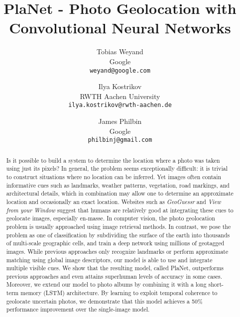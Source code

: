 \documentclass[10pt,twocolumn,letterpaper]{article}
\begin{document}
\title{PlaNet - Photo Geolocation with Convolutional Neural Networks}

\author{Tobias Weyand\\
Google\\
{\tt\small weyand@google.com}
\and
Ilya Kostrikov\\
RWTH Aachen University\\
{\tt\small ilya.kostrikov@rwth-aachen.de}
\and
James Philbin\\
Google\\
{\tt\small philbinj@gmail.com}
}

\maketitle

\graphicspath{{images/}}

\newcommand{\PAR}[1]{\vskip4pt \noindent {\bf #1}}

\makeatletter
\DeclareRobustCommand\onedot{\futurelet\@let@token\@onedot}
\def\@onedot{\ifx\@let@token.\else.\null\fi\xspace}
\def\eg{\emph{e.g}\onedot} \def\Eg{\emph{E.g}\onedot}
\def\ie{\emph{i.e}\onedot} \def\Ie{\emph{I.e}\onedot}
\def\cf{\emph{cf}\onedot} \def\Cf{\emph{Cf}\onedot}
\def\etc{\emph{etc}\onedot} \def\vs{\emph{vs}\onedot}
\def\wrt{w.r.t\onedot} \def\dof{d.o.f\onedot}
\def\etal{\emph{et al}\onedot}
\def\vs{vs\onedot}
\makeatother

\begin{abstract}
Is it possible to build a system to determine the location where a photo was
taken using just its pixels? In general, the problem seems
exceptionally difficult: it is trivial to construct situations where
no location can be inferred. Yet images often contain informative cues
such as landmarks, weather patterns, vegetation, road markings, and
architectural details, which in combination may allow one to determine
an approximate location and occasionally an exact location. Websites
such as \emph{GeoGuessr} and \emph{View from your Window} suggest that humans are
relatively good at integrating these cues to geolocate images,
especially en-masse.
In computer vision, the photo geolocation problem is usually approached using image retrieval methods.
In contrast, we pose the problem as one of
classification by subdividing the surface of the earth into thousands
of multi-scale geographic cells, and train a deep network using
millions of geotagged images. While previous approaches
only recognize landmarks or perform approximate matching using global
image descriptors, our model is able to use and integrate multiple
visible cues. We show that the resulting model, called PlaNet,
outperforms previous approaches and even attains superhuman levels of
accuracy in some cases.
Moreover, we extend our model to photo albums by combining it with a
long short-term memory (LSTM) architecture. By learning to exploit
temporal coherence to geolocate uncertain photos, we demonstrate that
this model achieves a 50\% performance improvement over the
single-image model.
\end{abstract}
\end{document}
